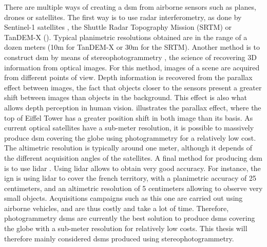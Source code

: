 There are multiple ways of creating a \acrshort{dsm} from airborne sensors such as planes, drones or satellites. The first way is to use \acrshort{radar} interferometry, as done by Sentinel-1 satellites \cite{geudtner_sentinel-1_2014}, the Shuttle Radar Topography Mission (SRTM) \cite{farr_shuttle_2007} or TanDEM-X (\cite{krieger_tandem-x_2007}). Typical planimetric resolutions obtained are in the range of a dozen meters (10m for TanDEM-X or 30m for the SRTM). Another method is to construct \acrshort{dsm} by means of stereophotogrammetry \cite{tao_comprehensive_2001}, \ie the science of recovering 3D information from optical images. For this method, images of a scene are acquired from different points of view. Depth information is recovered from the parallax effect between images, \ie the fact that objects closer to the sensors present a greater shift between images than objects in the background. This effect is also what allows depth perception in human vision.  illustrates the parallax effect, where the top of Eiffel Tower has a greater position shift in both image than its basis. As current optical satellites have a sub-meter resolution, it is possible to massively produce \acrshort{dsm} covering the globe using photogrammetry for a relatively low cost. The altimetric resolution is typically around one meter, although it depends of the different acquisition angles of the satellites. A final method for producing \acrshort{dsm} is to use \acrfull{lidar} \cite{khosravipour_generating_2016}. Using \acrshort{lidar} allows to obtain very good accuracy. For instance, the \acrfull{ign} is using \acrshort{lidar} to cover the french territory, with a planimetric accuracy of 25 centimeters, and an altimetric resolution of 5 centimeters allowing to observe very small objects. Acquisitions campaigns such as this one are carried out using airborne vehicles, and are thus costly and take a lot of time. Therefore, photogrammetry \acrshort{dsm}s are currently the best solution to produce \acrshort{dsm}s covering the globe  with a sub-meter resolution for relatively low costs. This thesis will therefore mainly considered \acrshort{dsm}s produced using stereophotogrammetry.

